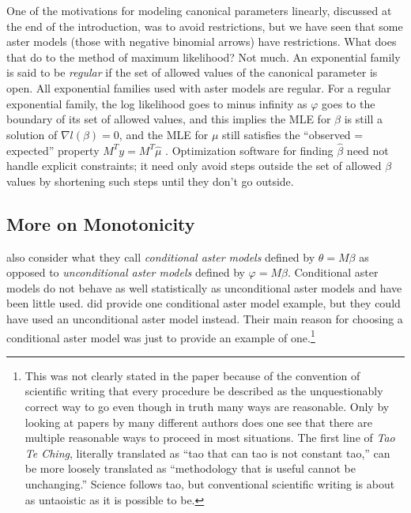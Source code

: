 \documentclass[11pt]{article}
\begin{document}
{\label{foot:restrict}
One of the motivations for modeling canonical parameters linearly, discussed
at the end of the introduction, was to avoid restrictions, but we have seen
that some aster models (those with negative binomial arrows) have restrictions.
What does that do to the method of maximum likelihood?  Not much.
An exponential family is said to be \emph{regular} if the set of allowed values
of the canonical parameter is open.  All exponential families used with aster
models are regular.  For a regular exponential family, the log likelihood goes
to minus infinity as $\varphi$ goes to the boundary
of its set of allowed values, and this implies the MLE for $\beta$ is still
a solution of $\nabla l(\beta) = 0$, and the MLE for $\mu$ still satisfies the
``observed = expected'' property $M^T y = M^T \hat{\mu}$
\citep[Corollary~9.6]{barndorff}.
Optimization software for finding $\hat{\beta}$ need not handle explicit
constraints; it need only avoid steps outside
the set of allowed $\beta$ values by shortening such steps until they don't
go outside.}

\subsection{More on Monotonicity} \label{sec:moron}

\citet{gws} also consider what they call \emph{conditional aster models}
defined by $\theta = M \beta$ as opposed to \emph{unconditional aster models}
defined by $\varphi = M \beta$.  Conditional aster models do not
behave as well statistically as unconditional aster models and have been little
used.  \citet{aster2} did provide one conditional aster model example,
but they could have used an unconditional aster model instead.
Their main reason for choosing a conditional aster model
was just to provide an example of one.\footnote{This was not clearly stated
in the paper because of the convention of
scientific writing that every procedure be described as the unquestionably
correct way to go even though in truth many ways are reasonable.  Only by
looking at papers by many different authors does one see that there are
multiple reasonable ways to proceed in most situations.
The first line of \emph{Tao Te Ching}, literally translated as
``tao that can tao is not constant tao,'' can be more loosely translated as
``methodology that is useful cannot be unchanging.''  Science follows tao,
but conventional scientific writing is about as untaoistic as it is possible
to be.}
\end{document}
